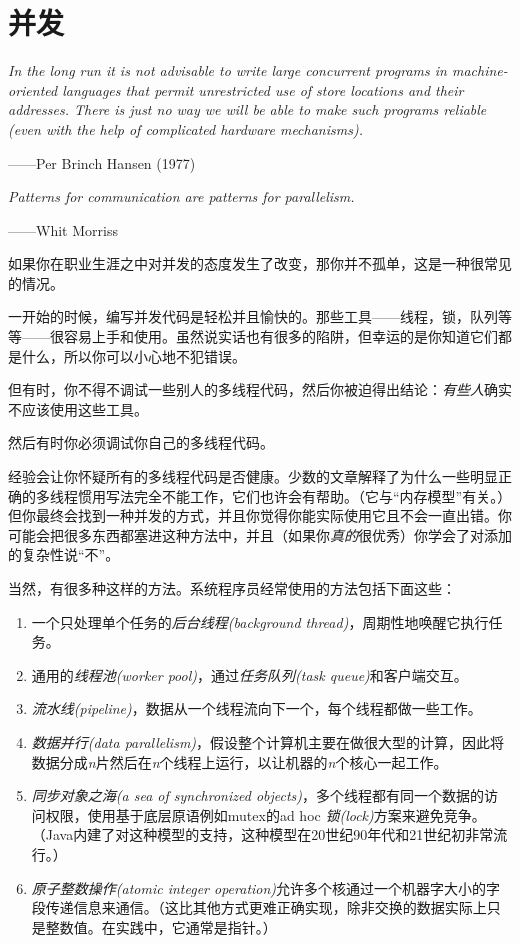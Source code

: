 \chapter{并发}\label{ch19}

\emph{In the long run it is not advisable to write large concurrent programs in machine-oriented languages that permit unrestricted use of store locations and their addresses. There is just no way we will be able to make such programs reliable (even with the help of complicated hardware mechanisms).}

\begin{flushright}
    ——Per Brinch Hansen (1977)
\end{flushright}

\emph{Patterns for communication are patterns for parallelism.}

\begin{flushright}
    ——Whit Morriss
\end{flushright}

如果你在职业生涯之中对并发的态度发生了改变，那你并不孤单，这是一种很常见的情况。

一开始的时候，编写并发代码是轻松并且愉快的。那些工具——线程，锁，队列等等——很容易上手和使用。虽然说实话也有很多的陷阱，但幸运的是你知道它们都是什么，所以你可以小心地不犯错误。

但有时，你不得不调试一些别人的多线程代码，然后你被迫得出结论：\emph{有些人}确实不应该使用这些工具。

然后有时你必须调试你自己的多线程代码。

经验会让你怀疑所有的多线程代码是否健康。少数的文章解释了为什么一些明显正确的多线程惯用写法完全不能工作，它们也许会有帮助。（它与“内存模型”有关。）但你最终会找到一种并发的方式，并且你觉得你能实际使用它且不会一直出错。你可能会把很多东西都塞进这种方法中，并且（如果你\emph{真的}很优秀）你学会了对添加的复杂性说“不”。

当然，有很多种这样的方法。系统程序员经常使用的方法包括下面这些：
\begin{enumerate}
    \item 一个只处理单个任务的\emph{后台线程(background thread)}，周期性地唤醒它执行任务。
    \item 通用的\emph{线程池(worker pool)}，通过\emph{任务队列(task queue)}和客户端交互。
    \item \emph{流水线(pipeline)}，数据从一个线程流向下一个，每个线程都做一些工作。
    \item \emph{数据并行(data parallelism)}，假设整个计算机主要在做很大型的计算，因此将数据分成\emph{n}片然后在\emph{n}个线程上运行，以让机器的\emph{n}个核心一起工作。
    \item \emph{同步对象之海(a sea of synchronized objects)}，多个线程都有同一个数据的访问权限，使用基于底层原语例如mutex的ad hoc \emph{锁(lock)}方案来避免竞争。（Java内建了对这种模型的支持，这种模型在20世纪90年代和21世纪初非常流行。）
    \item \emph{原子整数操作(atomic integer operation)}允许多个核通过一个机器字大小的字段传递信息来通信。（这比其他方式更难正确实现，除非交换的数据实际上只是整数值。在实践中，它通常是指针。）
\end{enumerate}

